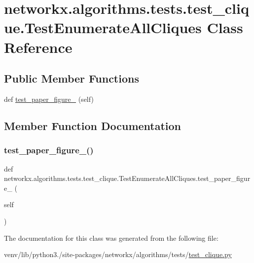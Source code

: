 \hypertarget{classnetworkx_1_1algorithms_1_1tests_1_1test__clique_1_1TestEnumerateAllCliques}{}\section{networkx.\+algorithms.\+tests.\+test\+\_\+clique.\+Test\+Enumerate\+All\+Cliques Class Reference}
\label{classnetworkx_1_1algorithms_1_1tests_1_1test__clique_1_1TestEnumerateAllCliques}
\subsection*{Public Member Functions}
\begin{DoxyCompactItemize}
\item 
def \hyperlink{classnetworkx_1_1algorithms_1_1tests_1_1test__clique_1_1TestEnumerateAllCliques_afcb6e4130fe9b9f6b4a783a10c44f3f9}{test\+\_\+paper\+\_\+figure\+\_} (self)
\end{DoxyCompactItemize}


\subsection{Member Function Documentation}
\mbox{\label{classnetworkx_1_1algorithms_1_1tests_1_1test__clique_1_1TestEnumerateAllCliques_afcb6e4130fe9b9f6b4a783a10c44f3f9}} 
\subsubsection{\texorpdfstring{test\+\_\+paper\+\_\+figure\+\_()}{test\_paper\_figure\_4()}}
{\footnotesize\ttfamily def networkx.\+algorithms.\+tests.\+test\+\_\+clique.\+Test\+Enumerate\+All\+Cliques.\+test\+\_\+paper\+\_\+figure\+\_ (\begin{DoxyParamCaption}\item[{}]{self }\end{DoxyParamCaption})}



The documentation for this class was generated from the following file\+:\begin{DoxyCompactItemize}
\item 
venv/lib/python3./site-\/packages/networkx/algorithms/tests/\hyperlink{tests_2test__clique_8py}{test\+\_\+clique.\+py}\end{DoxyCompactItemize}
